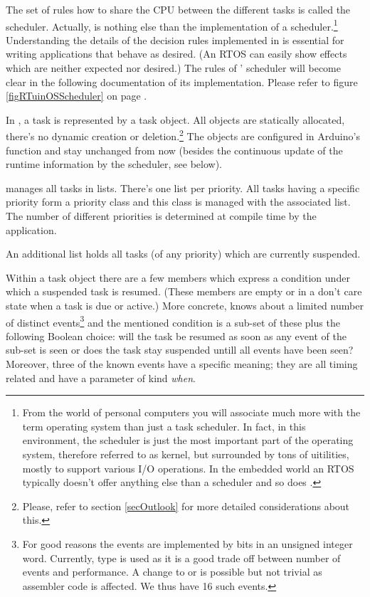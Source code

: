 The set of rules how to share the CPU between the different tasks is
called the scheduler. Actually, \rtos{} is nothing else than the
implementation of a scheduler.\footnote{From the world of personal
computers you will associate much more with the term operating system than
just a task scheduler. In fact, in this environment, the scheduler is just
the most important part of the operating system, therefore referred to as
kernel, but surrounded by tons of uitilities, mostly to support various
I/O operations. In the embedded world an RTOS typically doesn't offer
anything else than a scheduler and so does \rtos{}.} Understanding the
details of the decision rules implemented in \rtos{} is essential for
writing applications that behave as desired. (An RTOS can easily show
effects which are neither expected nor desired.) The rules of \rtos'
scheduler will become clear in the following documentation of its
implementation. Please refer to figure \ref{figRTuinOSScheduler} on page
\pageref{figRTuinOSScheduler}.

In \rtos{}, a task is represented by a task object. All objects are
statically allocated, there's no dynamic creation or
deletion.\footnote{Please, refer to section \ref{secOutlook} for more
detailed considerations about this.} The objects are configured in
Arduino's function  and stay unchanged from now (besides the
continuous update of the runtime information by the scheduler, see below).

\rtos{} manages all tasks in lists. There's one list per priority. All
tasks having a specific priority form a priority class and this class is
managed with the associated list. The number of different priorities is
determined at compile time by the application.

An additional list holds all tasks (of any priority) which are currently
suspended.

Within a task object there are a few members which express a condition
under which a suspended task is resumed. (These members are empty or in a
don't care state when a task is due or active.) More concrete, \rtos{}
knows about a limited number of distinct events\footnote{For good reasons
the events are implemented by bits in an unsigned integer word. Currently,
type  is used as it is a good trade off between number
of events and performance. A change to  or
 is possible but not trivial as assembler code is
affected. We thus have 16 such events.} and the mentioned condition is a
sub-set of these plus the following Boolean choice: will the task be
resumed as soon as any event of the sub-set is seen or does the task stay
suspended untill all events have been seen? Moreover, three of the known
events have a specific meaning; they are all timing related and have a
parameter of kind \emph{when}.

